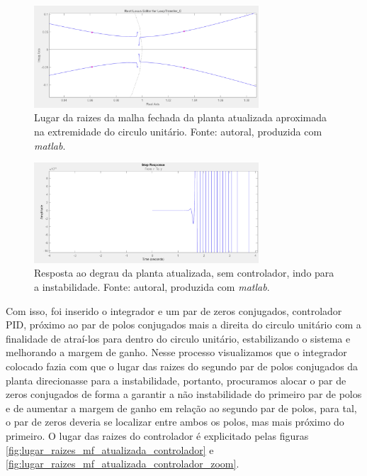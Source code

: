 \documentclass{ifacconf}
\begin{document}
\begin{figure}[!htb]
  \begin{center}
  \includegraphics[width=8.4cm]{figures/lugar_raizes_mf_corrigida_aproximada.png}    %
  \caption{Lugar da raizes da malha fechada da planta atualizada aproximada na extremidade do circulo unitário. Fonte: autoral, produzida com \textit{matlab}.} 
  \label{fig:lugar_raizes_mf_atualizada_zoom}
  \end{center}
\end{figure}

\begin{figure}[!htb]
  \begin{center}
  \includegraphics[width=8.4cm]{figures/resposta_degrau_mf_atualizado.png}    %
  \caption{Resposta ao degrau da planta atualizada, sem controlador, indo para a instabilidade. Fonte: autoral, produzida com \textit{matlab}.} 
  \label{fig:resposta_Degrau_mf_atualizada}
  \end{center}
\end{figure}

Com isso, foi inserido o integrador e um par de zeros conjugados, controlador PID, próximo ao par de polos conjugados mais a direita do circulo unitário com 
a finalidade de atraí-los para dentro do circulo unitário, estabilizando o sistema e melhorando a margem de ganho. Nesse processo visualizamos
que o integrador colocado fazia com que o lugar das raizes do segundo par de polos conjugados da planta direcionasse para a instabilidade, portanto,
procuramos alocar o par de zeros conjugados de forma a garantir a não instabilidade do primeiro par de polos e de aumentar a margem de ganho em relação
ao segundo par de polos, para tal, o par de zeros deveria se localizar entre ambos os polos, mas mais próximo do primeiro. O lugar das raizes do controlador
é explicitado pelas figuras \ref{fig:lugar_raizes_mf_atualizada_controlador} e \ref{fig:lugar_raizes_mf_atualizada_controlador_zoom}. 
\end{document}
